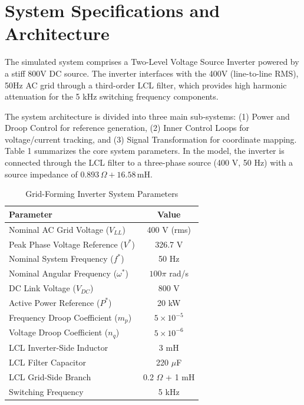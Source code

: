 \documentclass[12pt, a4paper]{article}
\begin{document}
	\newpage
	\tableofcontents
	\newpage
	
	\section{System Specifications and Architecture}
	The simulated system comprises a Two-Level Voltage Source Inverter powered by a stiff 800V DC source. The inverter interfaces with the 400V (line-to-line RMS), 50Hz AC grid through a third-order LCL filter, which provides high harmonic attenuation for the 5 kHz switching frequency components.
	
	The system architecture is divided into three main sub-systems: (1) Power and Droop Control for reference generation, (2) Inner Control Loops for voltage/current tracking, and (3) Signal Transformation for coordinate mapping. Table 1 summarizes the core system parameters. In the model, the inverter is connected through the LCL filter to a three-phase source (400 V, 50 Hz) with a source impedance of $0.893\,\Omega + 16.58\,\text{mH}$.
	
	\begin{table}[H]
		\centering
		\caption{Grid-Forming Inverter System Parameters}
		\begin{tabular}{lc}
			\hline
			\textbf{Parameter} & \textbf{Value} \\
			\hline
			Nominal AC Grid Voltage ($V_{LL}$) & 400 V (rms) \\
			Peak Phase Voltage Reference ($V^*$) & 326.7 V \\
			Nominal System Frequency ($f^*$) & 50 Hz \\
			Nominal Angular Frequency ($\omega^*$) & $100\pi$ rad/s \\
			DC Link Voltage ($V_{DC}$) & 800 V \\
			Active Power Reference ($P^*$) & 20 kW \\
			Frequency Droop Coefficient ($m_p$) & $5 \times 10^{-5}$ \\
			Voltage Droop Coefficient ($n_q$) & $5 \times 10^{-6}$ \\
			LCL Inverter-Side Inductor & 3 mH \\
			LCL Filter Capacitor & 220 $\mu$F \\
			LCL Grid-Side Branch & 0.2 $\Omega$ + 1 mH \\
			Switching Frequency & 5 kHz \\
			\hline
		\end{tabular}
	\end{table}
	
\end{document}
